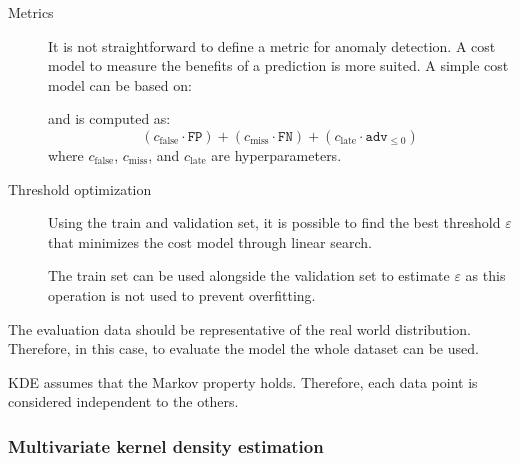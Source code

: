 \begin{description}
    \item[Metrics] 
        It is not straightforward to define a metric for anomaly detection. A cost model to measure the benefits of a prediction is more suited. A simple cost model can be based on:
        and is computed as:
        \[ (c_\text{false} \cdot \texttt{FP}) + (c_\text{miss} \cdot \texttt{FN}) + (c_\text{late} \cdot \texttt{adv}_{\leq 0}) \]
        where $c_\text{false}$, $c_\text{miss}$, and $c_\text{late}$ are hyperparameters.

    \item[Threshold optimization]
        Using the train and validation set, it is possible to find the best threshold $\varepsilon$ that minimizes the cost model through linear search.

        \begin{remark}
            The train set can be used alongside the validation set to estimate $\varepsilon$ as this operation is not used to prevent overfitting.
        \end{remark}
\end{description}

\begin{remark}
    The evaluation data should be representative of the real world distribution. Therefore, in this case, to evaluate the model the whole dataset can be used.
\end{remark}

\begin{remark}
    KDE assumes that the Markov property holds. Therefore, each data point is considered independent to the others.
\end{remark}


\subsubsection{Multivariate kernel density estimation}

